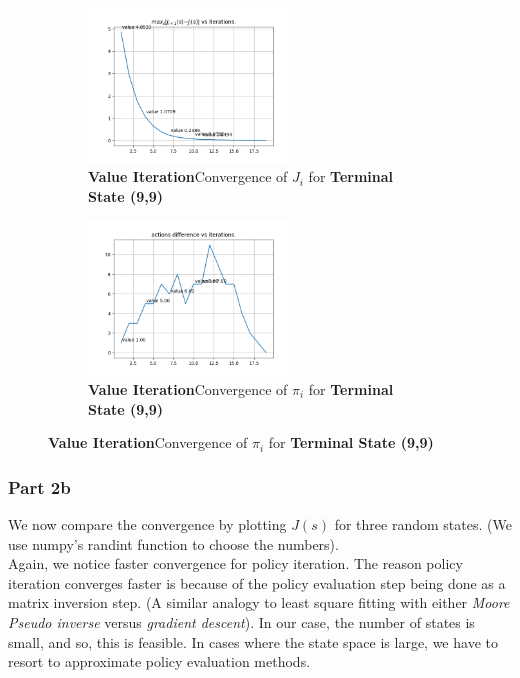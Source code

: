 \begin{figure}[h]
\begin{subfigure}
\centering
\includegraphics[angle=0,width=0.6\textwidth]{hw4/logs/value_iter_t=99_N=20/convergence-difference-till-20.png}
\caption{ \textbf{Value Iteration}Convergence of $J_i$ for \textbf{Terminal State (9,9)}}
\end{subfigure}

\begin{subfigure}
\centering
\includegraphics[angle=0,width=0.6\textwidth]{hw4/logs/value_iter_t=99_N=20/actions-difference-till-20.png}
\caption{ \textbf{Value Iteration}Convergence of $\pi_i$ for \textbf{Terminal State (9,9)}}
\end{subfigure}
\end{figure}

\subsubsection{Part 2b}

We now compare the convergence by plotting $J(s)$ for three random states. (We use numpy's randint function to choose the numbers).\\

Again, we notice faster convergence for policy iteration. The reason policy iteration converges faster is because of the policy evaluation step being done as a matrix inversion step. (A similar analogy to least square fitting with either \textit{Moore Pseudo inverse} versus \textit{gradient descent}). In our case, the number of states is small, and so, this is feasible. In cases where the state space is large, we have to resort to approximate policy evaluation methods. \\

